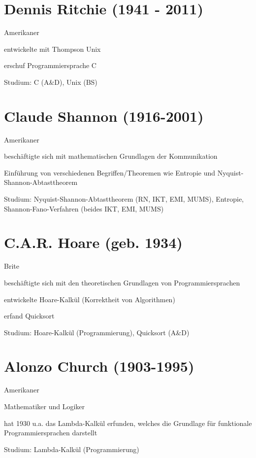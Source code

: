 \documentclass[a4paper,12pt]{report}
\begin{document}
\section{Dennis Ritchie (1941 - 2011)}
\begin{itemize*}
\item Amerikaner
\item entwickelte mit Thompson Unix
\item erschuf Programmiersprache C
\item Studium: C (A\&D), Unix (BS)
\end{itemize*}

\section{Claude Shannon (1916-2001)}
\begin{itemize*}
\item Amerikaner
\item beschäftigte sich mit mathematischen Grundlagen der Kommunikation
\item Einführung von verschiedenen Begriffen/Theoremen wie Entropie und Nyquist-Shannon-Abtasttheorem
\item Studium: Nyquist-Shannon-Abtasttheorem (RN, IKT, EMI, MUMS), Entropie, Shannon-Fano-Verfahren (beides IKT, EMI, MUMS)
\end{itemize*}
                                                                         
\section{C.A.R. Hoare (geb. 1934)}
\begin{itemize*}
\item Brite
\item beschäftigte sich mit den theoretischen Grundlagen von Programmiersprachen
\item entwickelte Hoare-Kalkül (Korrektheit von Algorithmen)
\item erfand Quicksort
\item Studium: Hoare-Kalkül (Programmierung), Quicksort (A\&D)
\end{itemize*}

\section{Alonzo Church (1903-1995)}
\begin{itemize*}
\item Amerikaner 
\item Mathematiker und Logiker
\item hat 1930 u.a. das Lambda-Kalkül erfunden, welches die Grundlage für funktionale Programmiersprachen darstellt
\item Studium: Lambda-Kalkül (Programmierung)
\end{itemize*}
\end{document}
